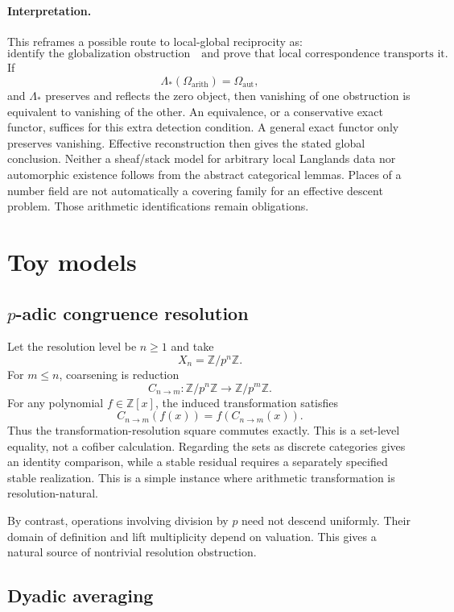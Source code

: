 \documentclass[11pt]{article}
\theoremstyle{definition}
\theoremstyle{remark}
\begin{document}
\paragraph{Interpretation.}
This reframes a possible route to local-global reciprocity as:
\[
\boxed{
\text{identify the globalization obstruction}
\quad\text{and prove that local correspondence transports it.}
}
\]
If
\[
\Lambda_*(\Omega_{\mathrm{arith}})=\Omega_{\mathrm{aut}},
\]
and $\Lambda_*$ preserves and reflects the zero object, then vanishing of one obstruction is equivalent to vanishing of the other. An equivalence, or a conservative exact functor, suffices for this extra detection condition. A general exact functor only preserves vanishing. Effective reconstruction then gives the stated global conclusion. Neither a sheaf/stack model for arbitrary local Langlands data nor automorphic existence follows from the abstract categorical lemmas. Places of a number field are not automatically a covering family for an effective descent problem. Those arithmetic identifications remain obligations.

\section{Toy models}

\subsection{\texorpdfstring{$p$}{p}-adic congruence resolution}

Let the resolution level be $n\ge1$ and take
\[
X_n=\mathbb Z/p^n\mathbb Z.
\]
For $m\le n$, coarsening is reduction
\[
C_{n\to m}:\mathbb Z/p^n\mathbb Z\to\mathbb Z/p^m\mathbb Z.
\]
For any polynomial $f\in\mathbb Z[x]$, the induced transformation satisfies
\[
C_{n\to m}(f(x))
=
f(C_{n\to m}(x)).
\]
Thus the transformation-resolution square commutes exactly. This is a set-level equality, not a cofiber calculation. Regarding the sets as discrete categories gives an identity comparison, while a stable residual requires a separately specified stable realization.
This is a simple instance where arithmetic transformation is resolution-natural.

By contrast, operations involving division by $p$ need not descend uniformly. Their domain of definition and lift multiplicity depend on valuation. This gives a natural source of nontrivial resolution obstruction.

\subsection{Dyadic averaging}
\end{document}
